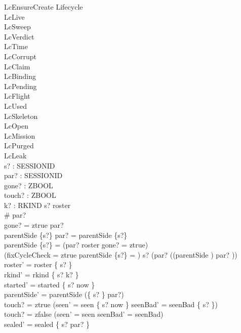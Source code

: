 \documentclass[a4paper,10pt,fleqn]{article}
\begin{document}
\begin{schema}{LcEnsureCreate}
\Delta Lifecycle \\
\Xi LcLive \\
\Xi LcSweep \\
\Xi LcVerdict \\
\Xi LcTime \\
\Xi LcCorrupt \\
\Xi LcClaim \\
\Xi LcBinding \\
\Xi LcPending \\
\Xi LcFlight \\
\Xi LcUsed \\
\Xi LcSkeleton \\
\Xi LcOpen \\
\Xi LcMission \\
\Xi LcPurged \\
\Xi LcLeak \\
s? : SESSIONID \\
par? : \power SESSIONID \\
gone? : ZBOOL \\
touch? : ZBOOL \\
k? : RKIND
\where
s? \notin roster \\
\# par?  \\
gone? = ztrue \implies par? \neq \emptyset \\
parentSide \limg \{s?\} \rimg \neq \emptyset \implies par? = parentSide \limg \{s?\} \rimg \\
parentSide \limg \{s?\} \rimg = \emptyset \implies (par? \subseteq roster \lor gone? = ztrue) \\
(fixCycleCheck = ztrue \land parentSide \limg \{s?\} \rimg = \emptyset) \implies s? \notin (par? \cup ((parentSide \plus) \limg par? \rimg)) \\
roster' = roster \cup \{ s? \} \\
rkind' = rkind \oplus \{ s? \mapsto k? \} \\
started' = started \oplus \{ s? \mapsto now \} \\
parentSide' = parentSide \cup (\{ s? \} \cross par?) \\
touch? = ztrue \implies (seen' = seen \oplus \{ s? \mapsto now \} \land seenBad' = seenBad \setminus \{ s? \}) \\
touch? = zfalse \implies (seen' = seen \land seenBad' = seenBad) \\
sealed' = sealed \oplus \{ s? \mapsto par? \}
\end{schema}
\end{document}
